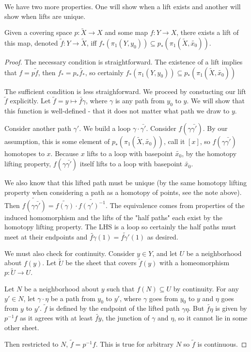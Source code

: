 \documentclass[10pt]{article}
\begin{document}
We have two more properties. One will show when a lift exists and another will
show when lifts are unique.

\begin{proposition}
	Given a covering space $p: \tilde{X} \to X$ and some map $f: Y \to X$, there
	exists a lift of this map, denoted $\tilde{f}: Y \to \tilde{X}$, iff $f_*(\pi_1(Y, y_0)) \subseteq
	p_*(\pi_1(\tilde{X}, \tilde{x_0}))$.
\end{proposition}

\begin{proof}
	The necessary condition is straightforward. The existence of a lift implies
	that $f = p\tilde{f}$, then $f_* = p_*\tilde{f_*}$, so certainly
	$f_*(\pi_1(Y, y_0)) \subseteq p_*(\pi_1(\tilde{X}, \tilde{x_0}))$

	The sufficient condition is less straighforward. We proceed by constucting
	our lift $\tilde{f}$ explicitly. Let $\tilde{f} = y \mapsto \tilde{f\gamma}$,
	where $\gamma$ is any path from $y_0$ to $y$. We will show that this function
	is well-defined - that it does not matter what path we draw to $y$. 

	Consider another path $\gamma'$. We build a loop $\gamma \cdot \bar{\gamma'}$.
	Consider $f(\gamma \bar{\gamma'})$. By our assumption, this is some element
	of $p_*(\pi_1(\tilde{X}, \tilde{x_0}))$, call it $[ x ]$, so $f(\gamma
	\bar{\gamma'})$ homotopes to $x$. Because $x$ lifts to a loop with basepoint $\tilde{x_0}$, by the homotopy
	lifting property, $f(\gamma \bar{\gamma'})$ itself lifts to a loop with
	basepoint $\tilde{x_0}$. 

	We also know that this lifted path must be unique (by the same homotopy
	lifting property when considering a path as a homotopy of points, see the
	note above). Then $\tilde{f(\gamma \bar{\gamma'})} = \tilde{f(\gamma)} \cdot
	\tilde{f(\gamma')^{-1}}$. The equivalence comes from properties of the
	induced homomorphism and the lifts of the "half paths" each exist by the homotopy
	lifting property. The LHS is a loop so certainly the half paths must meet at
	their endpoints and $\tilde{f\gamma}(1) = \tilde{f\gamma'}(1)$ as desired.

	We must also check for continuity. Consider $y \in Y$, and let $U$ be a
	neighborhood about $f(y)$. Let $\tilde{U}$ be the sheet that covers
	$\tilde{f}(y)$ with a homeomorphism $p: \tilde{U} \to U$. 

	Let $N$ be a neighborhood about $y$ such that $f(N) \subseteq U$ by
	continuity. For any $y' \in N$, let $\gamma \cdot \eta$ be a path from $y_0$
	to $y'$, where $\gamma$ goes from $y_0$ to $y$ and $\eta$ goes from $y$ to
	$y'$. $\tilde{f}$ is defined by the endpoint of the lifted path $\gamma
	\eta$. But $\tilde{f \eta}$ is given by $p^{-1}f$ as it agrees with at least
	$\tilde{f y}$, the junction of $\gamma$ and $\eta$, so it cannot lie in some other sheet.

	Then restricted to $N$, $\tilde{f} = p^{-1}f$. This is true for
	arbitrary $N$ so $\tilde{f}$ is continuous.
\end{proof}
\end{document}
